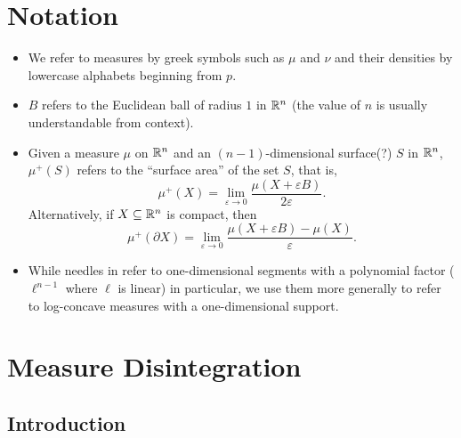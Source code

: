 \documentclass{article}
\begin{document}
\thispagestyle{empty}
\titleBC

\setcounter{section}{-1}

\section{Notation}

\begin{itemize}
	\item We refer to measures by greek symbols such as $\mu$ and $\nu$ and their densities by lowercase alphabets beginning from $p$.
	\item $B$ refers to the Euclidean ball of radius $1$ in $\mathbb{R}^n$ (the value of $n$ is usually understandable from context).
	\item Given a measure $\mu$ on $\mathbb{R}^n$ and an $(n-1)$-dimensional surface(?) $S$ in $\mathbb{R}^n$, $\mu^+(S)$ refers to the ``surface area'' of the set $S$, that is,
	\[ \mu^+(X) = \lim_{\varepsilon \to 0} \frac{\mu(X + \varepsilon B )}{2\varepsilon}. \]
	Alternatively, if $X \subseteq \mathbb{R}^n$ is compact, then
	\[ \mu^+(\partial X) = \lim_{\varepsilon \to 0} \frac{\mu(X + \varepsilon B) - \mu(X)}{\varepsilon}. \]
	\item While needles in \cite{KLSConjecture} refer to one-dimensional segments with a polynomial factor ($\ell^{n-1}$ where $\ell$ is linear) in particular, we use them more generally to refer to log-concave measures with a one-dimensional support.
\end{itemize}

\section{Measure Disintegration}

\subsection{Introduction}
\end{document}

